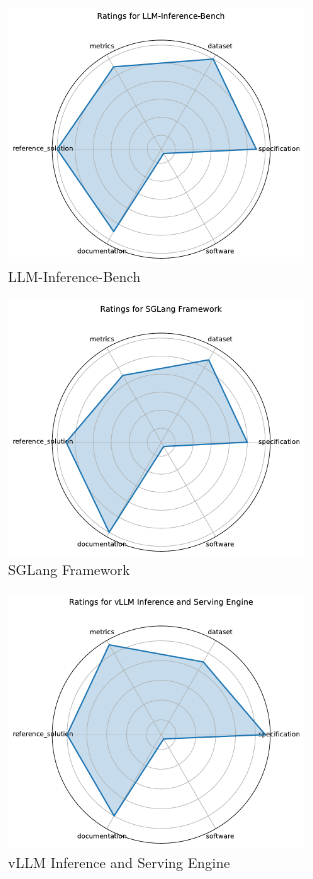 \documentclass{article}
\begin{document}
\begin{figure}[h!]
  \centering
  \includegraphics[width=0.7\textwidth]{LLM-Inference-Bench_radar.pdf}
  \caption{LLM-Inference-Bench}
\end{figure}

\begin{figure}[h!]
  \centering
  \includegraphics[width=0.7\textwidth]{SGLang Framework_radar.pdf}
  \caption{SGLang Framework}
\end{figure}

\begin{figure}[h!]
  \centering
  \includegraphics[width=0.7\textwidth]{vLLM Inference and Serving Engine_radar.pdf}
  \caption{vLLM Inference and Serving Engine}
\end{figure}
\end{document}
